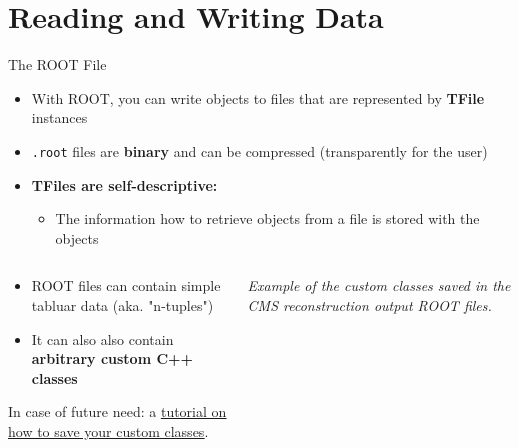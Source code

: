 \documentclass[aspectratio=169]{beamer}
\newcommand{\myfigure}[2]{
    \begin{figure}
        \makebox[\textwidth]{%
            \texttt{[image: \#2]}
        }
    \end{figure}
}
\newcommand{\myhref}[2]{{\color{blue}\href{#1}{\underline{#2}}}}
\begin{document}
\section{Reading and Writing Data}

\begin{frame}{The ROOT File}
\begin{itemize}
    \item With ROOT, you can write objects to files that are represented by \textbf{TFile} instances
    \item \texttt{.root} files are \textbf{binary} and can be compressed (transparently for the user)
    \item \textbf{TFiles are self-descriptive:}
    \begin{itemize}
        \item The information how to retrieve objects from a file is stored with the objects
    \end{itemize}
\end{itemize}

\begin{columns}
    \begin{column}{0.5\textwidth}
        \begin{itemize}
            \item ROOT files can contain simple tabluar data (aka. "n-tuples")
            \item It can also also contain \textbf{arbitrary custom C++ classes}
        \end{itemize}
\vspace{0.5cm}
{\footnotesize In case of future need: a \myhref{https://github.com/eguiraud/root_dictionaries_tutorial}{tutorial on how to save your custom classes}.}
    \end{column}
    \begin{column}{0.5\textwidth}
        \myfigure{1.1}{whats_in_aod_reco.png}
        \textit{Example of the custom classes saved in the CMS reconstruction output ROOT files.}
    \end{column}
\end{columns}

\end{frame}
\end{document}
